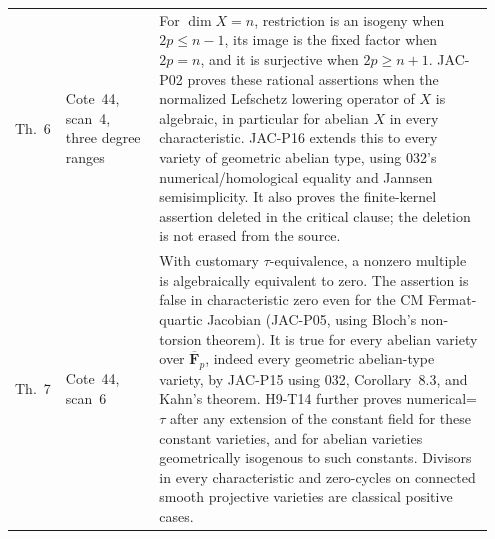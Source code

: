 \documentclass[11pt,a4paper]{article}
\begin{document}
\begin{longtable}{@{}p{0.08\linewidth}p{0.19\linewidth}p{0.68\linewidth}@{}}
Th.~6 & Cote~44, scan~4, three degree ranges &
For $\dim X=n$, restriction is an isogeny when $2p\le n-1$,
its image is the fixed factor when $2p=n$, and it is surjective
when $2p\ge n+1$. JAC-P02 proves these rational assertions when
the normalized Lefschetz lowering operator of $X$ is algebraic,
in particular for abelian $X$ in every characteristic. JAC-P16
extends this to every variety of geometric abelian type, using
032's numerical/homological equality and Jannsen semisimplicity. It also
proves the finite-kernel assertion deleted in the critical clause;
the deletion is not erased from the source.\\

Th.~7 & Cote~44, scan~6 &
With customary $\tau$-equivalence, a nonzero multiple is
algebraically equivalent to zero. The assertion is false in
characteristic zero even for the CM Fermat-quartic Jacobian
(JAC-P05, using Bloch's non-torsion theorem).
It is true for every abelian variety over $\overline{\mathbf F}_p$,
indeed every geometric abelian-type variety, by JAC-P15 using
032, Corollary~8.3, and Kahn's theorem. H9-T14 further proves
numerical=$\tau$ after any extension of the constant field for
these constant varieties, and for abelian varieties geometrically
isogenous to such constants. Divisors in every
characteristic and zero-cycles on connected smooth projective
varieties are classical positive cases.\\
\bottomrule
\end{longtable}
\endgroup
\end{document}
